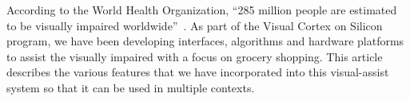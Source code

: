 According to the World Health Organization, ``285 million people are estimated
to be visually impaired worldwide''~\cite{WHO}.
As part of the Visual Cortex on Silicon program, we have been
developing interfaces, algorithms and hardware platforms to assist the
visually impaired with a focus on grocery shopping. This article describes
the various features that we have incorporated 
into this visual-assist system so that it can be used in multiple contexts.
